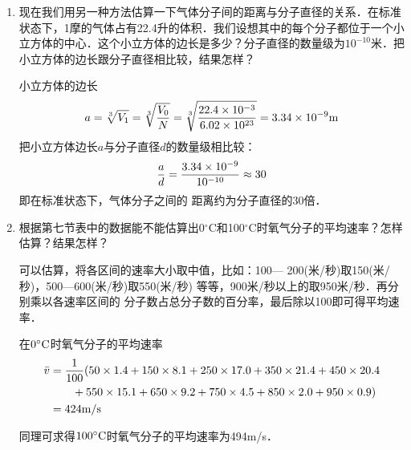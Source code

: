 \begin{enumerate}
	\item 现在我们用另一种方法估算一下气体分子间的距离与分子直径的关系．在标准状态下，1摩的气体占有22.4升的体积．我们设想其中的每个分子都位于一个小立方体的中心．这个小立方体的边长是多少？分子直径的数量级为$10^{-10}$米．把小立方体的边长跟分子直径相比较，结果怎样？

\begin{solution}
    小立方体的边长
\[a=\sqrt[3]{V_1}=\sqrt[3]{\frac{V_0}{N}}=\sqrt[3]{\frac{22.4\times 10^{-3}}{6.02\times 10^{23}}}=3.34\times 10^{-9}{\rm m}\]
把小立方体边长$a$与分子直径$d$的数量级相比较：
\[\frac{a}{d}=\frac{3.34\times 10^{-9}}{10^{-10}}\approx 30\]
即在标准状态下，气体分子之间的
距离约为分子直径的30倍．
\end{solution}
\item 根据第七节表中的数据能不能估算出0$^\circ$C和100$^\circ$C时氧气分子的平均速率？怎样估算？结果怎样？

\begin{solution}
    可以估算，将各区间的速率大小取中值，比如：100—
200(米/秒)取150(米/秒)，500—600(米/秒)取550(米/秒)
等等，900米/秒以上的取950米/秒．再分别乘以各速率区间的
分子数占总分子数的百分率，最后除以100即可得平均速率．

在$0^{\circ}{\rm C}$时氧气分子的平均速率
\[\begin{split}
    \bar v&=\frac{1}{100}(50\times1.4+150\times8.1
+250\times17.0+350\times21.4+450\times20.4\\
&\qquad +550\times15.1+650\times9.2
+750\times4.5+850\times2.0+950\times0.9) \\
&=424{\rm m/s}
\end{split}\]

同理可求得$100^{\circ}{\rm C}$时氧气分子的平均速率为494{\rm m/s}．
\end{solution}
\end{enumerate}



